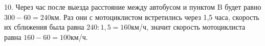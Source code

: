 10. Через час после выезда расстояние между автобусом и пунктом B будет равно $300-60=240$км. Раз они с мотоциклистом встретились через 1,5 часа, скорость их сближения была равна $240:1,5=160$км/ч, значит скорость мотоциклиста равна $160-60=100$км/ч.\\
